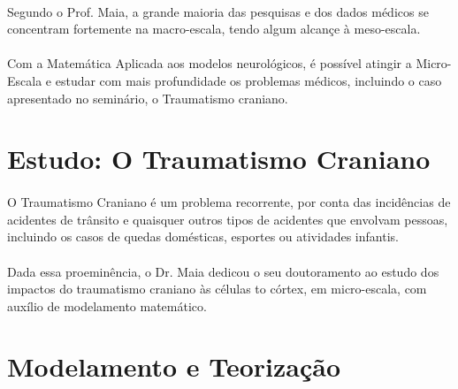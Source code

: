 \documentclass{article}
\begin{document}
	\paragraph{}
	Segundo o Prof. Maia, a grande maioria das pesquisas e dos dados médicos se concentram fortemente na macro-escala, tendo algum alcançe à meso-escala.
	
	\paragraph{}
	Com a Matemática Aplicada aos modelos neurológicos, é possível atingir a Micro-Escala e estudar com mais profundidade os problemas médicos, incluindo o caso apresentado no seminário, o Traumatismo craniano.
	
	\section{Estudo: O Traumatismo Craniano}
	
	\paragraph{}
	O Traumatismo Craniano é um problema recorrente, por conta das incidências de acidentes de trânsito e quaisquer outros tipos de acidentes que envolvam pessoas, incluindo os casos de quedas domésticas, esportes ou atividades infantis. 
	
	\paragraph{}
	Dada essa proeminência, o Dr. Maia dedicou o seu doutoramento ao estudo dos impactos do traumatismo craniano às células to córtex, em micro-escala, com auxílio de modelamento matemático.
	
	\section{Modelamento e Teorização}
	
\end{document}

